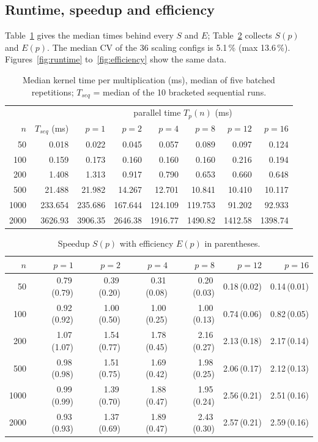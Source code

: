 \documentclass[11pt,a4paper]{article}
\begin{document}
\subsection{Runtime, speedup and efficiency}

Table~\ref{tab:runtime} gives the median times behind every $S$ and $E$;
Table~\ref{tab:scaling} collects $S(p)$ and $E(p)$. The median CV of the 36
scaling configs is 5.1\,\% (max 13.6\,\%). Figures~\ref{fig:runtime}
to~\ref{fig:efficiency} show the same data.

\begin{table}[h!]
\centering
\small
\setlength{\tabcolsep}{4pt}
\begin{tabular}{r|rrrrrrr}
\toprule
 &  & \multicolumn{6}{c}{parallel time $T_p(n)$ (ms)} \\
$n$ & $T_{seq}$ (ms) & $p{=}1$ & $p{=}2$ & $p{=}4$ & $p{=}8$ & $p{=}12$ & $p{=}16$ \\
\midrule
50   & 0.018   & 0.022   & 0.045   & 0.057   & 0.089   & 0.097   & 0.124 \\
100  & 0.159   & 0.173   & 0.160   & 0.160   & 0.160   & 0.216   & 0.194 \\
200  & 1.408   & 1.313   & 0.917   & 0.790   & 0.653   & 0.660   & 0.648 \\
500  & 21.488  & 21.982  & 14.267  & 12.701  & 10.841  & 10.410  & 10.117 \\
1000 & 233.654 & 235.686 & 167.644 & 124.109 & 119.753 & 91.202  & 92.933 \\
2000 & 3626.93 & 3906.35 & 2646.38 & 1916.77 & 1490.82 & 1412.58 & 1398.74 \\
\bottomrule
\end{tabular}
\caption{Median kernel time per multiplication (ms), median of five batched
repetitions; $T_{seq}$ = median of the 10 bracketed sequential runs.}
\label{tab:runtime}
\end{table}

\begin{table}[h!]
\centering
\small
\setlength{\tabcolsep}{5pt}
\begin{tabular}{r|rrrrrr}
\toprule
$n$ & $p{=}1$ & $p{=}2$ & $p{=}4$ & $p{=}8$ & $p{=}12$ & $p{=}16$ \\
\midrule
50   & 0.79\,(0.79) & 0.39\,(0.20) & 0.31\,(0.08) & 0.20\,(0.03) & 0.18\,(0.02) & 0.14\,(0.01) \\
100  & 0.92\,(0.92) & 1.00\,(0.50) & 1.00\,(0.25) & 1.00\,(0.13) & 0.74\,(0.06) & 0.82\,(0.05) \\
200  & 1.07\,(1.07) & 1.54\,(0.77) & 1.78\,(0.45) & 2.16\,(0.27) & 2.13\,(0.18) & 2.17\,(0.14) \\
500  & 0.98\,(0.98) & 1.51\,(0.75) & 1.69\,(0.42) & 1.98\,(0.25) & 2.06\,(0.17) & 2.12\,(0.13) \\
1000 & 0.99\,(0.99) & 1.39\,(0.70) & 1.88\,(0.47) & 1.95\,(0.24) & 2.56\,(0.21) & 2.51\,(0.16) \\
2000 & 0.93\,(0.93) & 1.37\,(0.69) & 1.89\,(0.47) & 2.43\,(0.30) & 2.57\,(0.21) & 2.59\,(0.16) \\
\bottomrule
\end{tabular}
\caption{Speedup $S(p)$ with efficiency $E(p)$ in parentheses.}
\label{tab:scaling}
\end{table}
\end{document}
